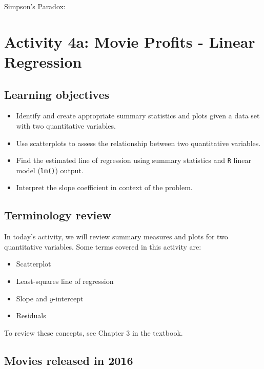 \documentclass[
]{report}
\begin{document}
Simpson's Paradox:

\newpage

\hypertarget{activity-4a-movie-profits---linear-regression}{%
\section{Activity 4a: Movie Profits - Linear Regression}\label{activity-4a-movie-profits---linear-regression}}


\hypertarget{learning-objectives-2}{%
\subsection{Learning objectives}\label{learning-objectives-2}}

\begin{itemize}
\item
  Identify and create appropriate summary statistics and plots
  given a data set with two quantitative variables.
\item
  Use scatterplots to assess the relationship between two quantitative variables.
\item
  Find the estimated line of regression using summary statistics and \texttt{R} linear model (\texttt{lm()}) output.
\item
  Interpret the slope coefficient in context of the problem.
\end{itemize}

\hypertarget{terminology-review-6}{%
\subsection{Terminology review}\label{terminology-review-6}}

In today's activity, we will review summary measures and plots for two quantitative variables. Some terms covered in this activity are:

\begin{itemize}
\item
  Scatterplot
\item
  Least-squares line of regression
\item
  Slope and \(y\)-intercept
\item
  Residuals
\end{itemize}

To review these concepts, see Chapter 3 in the textbook.

\hypertarget{movies-released-in-2016-1}{%
\subsection{Movies released in 2016}\label{movies-released-in-2016-1}}
\end{document}
